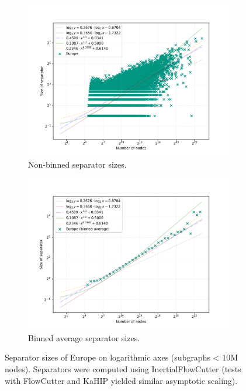 \begin{figure}[tbhp]
    \begin{subfigure}{0.49\linewidth}
        \centering
        \includegraphics[width=\linewidth]{graphics/Europe_non_binned.png}
        \caption{Non-binned separator sizes.}
        \label{fig:separator_size_loglog_non_binned}
    \end{subfigure}
    \hfill
    \begin{subfigure}{0.49\linewidth}
        \centering
        \includegraphics[width=\linewidth]{graphics/Europe-binned.pdf}
        \caption{Binned average separator sizes.}
        \label{fig:separator_size_loglog_binned}
    \end{subfigure}
    \caption{Separator sizes of Europe on logarithmic axes (subgraphs < 10M nodes). Separators were computed using InertialFlowCutter (tests with FlowCutter and KaHIP yielded similar asymptotic scaling).}
    \label{fig:separator_size_loglog}
\end{figure}

